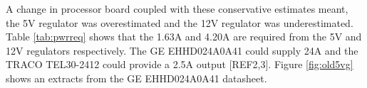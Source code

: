 \begin{table}[ht]
\caption{Cyclones Power Requirements}
\label{tab:pwrreq}
\end{table}

A change in processor board coupled with these conservative estimates meant, the 5V regulator was overestimated and the 12V regulator was underestimated. Table \ref{tab:pwrreq} shows that the 1.63A and 4.20A are required from the 5V and 12V regulators respectively. The GE EHHD024A0A41 could supply 24A and the TRACO TEL30-2412 could provide a 2.5A output [REF2,3]. Figure \ref{fig:old5vg} shows an extracts from the GE EHHD024A0A41 datasheet.\par

